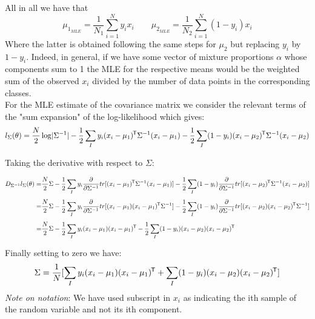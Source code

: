 All in all we have that 
\begin{equation}
    \mu_{1_{MLE}} = \frac{1}{N_1}\sum_{i=1}^N y_i x_i \qquad 
    \mu_{2_{MLE}} = \frac{1}{N_2}\sum_{i=1}^N (1-y_i) x_i
\end{equation}
%
Where the latter is obtained
following the same steps for $\mu_2$ but replacing $y_i$ by $1-y_i$.
Indeed, in general,  if we have some vector of
mixture proportions $\alpha$ whose components sum to 1 the MLE for the respective means
would be the weighted sum of the observed $x_i$ divided by the number of data points in
the corresponding classes.\\
\clearpage
For the MLE estimate of the covariance matrix we consider the relevant
terms of the "sum expansion" of the log-likelihood which gives:
\begin{equation}
    l_{\Sigma}(\theta) = \frac{N}{2} \log \lvert\Sigma^{-1}\rvert
			-\frac{1}{2} \sum_I y_i (x_i - \mu_1)^{\mkern-1.5mu\mathsf{T}} 
			    \Sigma^{-1}(x_i - \mu_1)
			 -\frac{1}{2} \sum_I (1-y_i)(x_i - \mu_2)^{\mkern-1.5mu\mathsf{T}} 
			    \Sigma^{-1} (x_i - \mu_2) 
\end{equation}

Taking the derivative with respect to $\Sigma$:

\begin{align*}
D_{\Sigma^{-1}}l_{\Sigma}(\theta) = 
  &\frac{N}{2}  \Sigma
  -\frac{1}{2} \sum_I y_i \frac{\partial}{\partial \Sigma^{-1}}
      tr[(x_i - \mu_1)\tran \Sigma^{-1}(x_i - \mu_1)]
      -\frac{1}{2} \sum_I (1-y_i) \frac{\partial}{\partial \Sigma^{-1}}
      tr[(x_i - \mu_2)\tran \Sigma^{-1} (x_i - \mu_2)] \\[1ex]
%
  = & \frac{N}{2} \Sigma
    -\frac{1}{2} \sum_I y_i \frac{\partial}{\partial \Sigma^{-1}}
	  tr[(x_i - \mu_1)(x_i - \mu_1)\tran \Sigma^{-1}]
      -\frac{1}{2} \sum_I (1-y_i) \frac{\partial}{\partial \Sigma^{-1}}
      tr[(x_i - \mu_2)(x_i - \mu_2)\tran \Sigma^{-1} ] \\[1ex]
%
  = & \frac{N}{2} \Sigma
    -\frac{1}{2} \sum_I y_i  (x_i - \mu_1)(x_i - \mu_1)\tran 
      -\frac{1}{2} \sum_I (1-y_i) (x_i - \mu_2)(x_i - \mu_2)\tran  \\[1ex]
\end{align*}
Finally setting to zero we have:
\begin{equation}
    \Sigma = \frac{1}{N}[ \sum_I y_i  (x_i - \mu_1)(x_i - \mu_1)^{\mkern-1.5mu\mathsf{T}} +
    \sum_I (1-y_i) (x_i - \mu_2)(x_i - \mu_2)^{\mkern-1.5mu\mathsf{T}}]  
\end{equation}
\textit{Note on notation}: We have used subscript in $x_i$ as indicating the ith sample
of the random variable and not its ith component.\\
\clearpage

